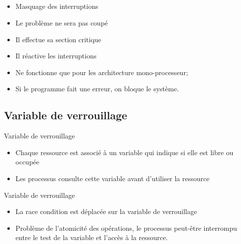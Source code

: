 \subsection{\subsectitle}
\begin{frame}{\sectitle}
\begin{block}{\subsectitle}
\begin{itemize}
\item Masquage des interruptions
\item Le problème ne sera pas coupé
\item Il effectue sa section critique
\item Il réactive les interruptions
\end{itemize}
\end{block}

\begin{block}{\subsectitle}
\begin{itemize}
\item Ne fonctionne que pour les architecture mono-processeur;
\item Si le programme fait une erreur, on bloque le système.
\end{itemize}
\end{block}
\end{frame}

\begin{frame}{\sectitle}
\def\subsectitle{Variable de verrouillage}
\subsection{\subsectitle}
\begin{block} {\subsectitle}
\begin{itemize}
\item Chaque ressource est associé à un variable qui indique si elle est libre
ou occupée
\item Les processus consulte cette variable avant d'utiliser la ressource
\end{itemize}
\end{block} 

\begin{block}{\subsectitle}
\begin{itemize}
\item La race condition est déplacée sur la variable de verrouillage
    \item Problème de l'atomicité des opérations, le processus peut-être
    interrompu entre le test de la variable et l'accès à la ressource.
\end{itemize}
\end{block}
\end{frame}

